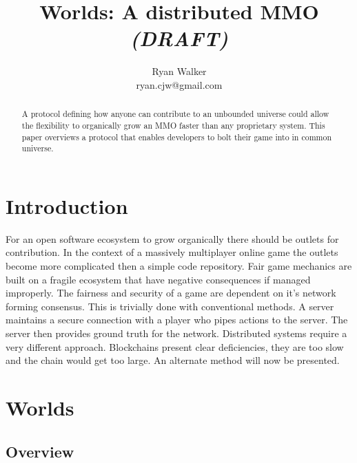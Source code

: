 \documentclass[runningheads,a4paper]{llncs}
\begin{document}
\def \SystemName {Worlds} %

\mainmatter  %

\title{\SystemName: A distributed MMO \textit{(DRAFT)}}

\author{Ryan Walker\\
				ryan.cjw@gmail.com}

\institute{} %

\maketitle

\begin{abstract}
A protocol defining how anyone can contribute to an unbounded universe could allow the flexibility to organically grow an MMO faster than any proprietary system. This paper overviews a protocol that enables developers to bolt their game into in common universe. 
\end{abstract}

\section{Introduction}
For an open software ecosystem to grow organically there should be outlets for contribution. In the context of a massively multiplayer online game the outlets become more complicated then a simple code repository. Fair game mechanics are built on a fragile ecosystem that have negative consequences if managed improperly. The fairness and security of a game are dependent on it's network forming consensus. This is trivially done with conventional methods. A server maintains a secure connection with a player who pipes actions to the server. The server then provides ground truth for the network. Distributed systems require a very different approach. Blockchains present clear deficiencies, they are too slow and the chain would get too large. An alternate method will now be presented.

\section{Worlds}
\subsection{Overview}
\end{document}
